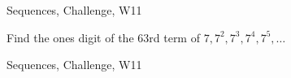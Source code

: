 \begin{tagblock}{Sequences, Challenge, W11}
\begin{question}

Find the ones digit of the 63rd term of $7,7^2,7^3,7^4,7^5,\dots$
	
	
\begin{tags}
	    Sequences, Challenge, W11
\end{tags}
	
\begin{diary}
	   
\end{diary}
	
\begin{solution}	

\end{solution}
	
\end{question}

\end{tagblock}



